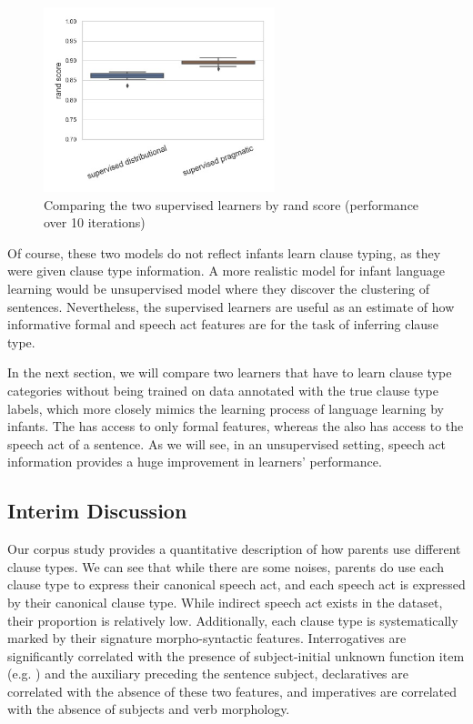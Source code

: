 \begin{figure}[H]
    \centering
    \includegraphics[width=0.6\textwidth]{figures/super-compare-rand.jpg}
    \caption{Comparing the two supervised learners by rand score (performance over 10 iterations)}
    \label{fig:super-compare-rand}
\end{figure}

Of course, these two models do not reflect  infants learn clause typing, as they were given clause type information. A more realistic model for infant language learning would be unsupervised model where they discover the clustering of sentences. Nevertheless, the supervised learners are useful as an estimate of how informative formal and speech act features are for the task of inferring clause type.

In the next section, we will compare two  learners that have to learn clause type categories without being trained on data annotated with the true clause type labels, which more closely mimics the learning process of language learning by infants. The  has access to only formal features, whereas the  also has access to the speech act of a sentence. As we will see, in an unsupervised setting, speech act information provides a huge improvement in learners' performance.


\subsection{Interim Discussion}
\label{sec:engcl:corpus:disc}
Our corpus study provides a quantitative description of how parents use different clause types. We can see that while there are some noises, parents do use each clause type to express their canonical speech act, and each speech act is expressed by their canonical clause type. While indirect speech act exists in the dataset, their proportion is relatively low. Additionally, each clause type is systematically marked by their signature morpho-syntactic features. Interrogatives are significantly correlated with the presence of subject-initial unknown function item (e.g. \twh{}) and the auxiliary preceding the sentence subject, declaratives are correlated with the absence of these two features, and imperatives are correlated with the absence of subjects and verb morphology.  



